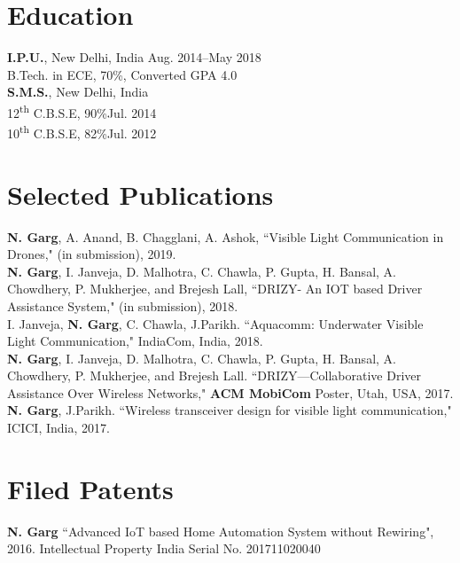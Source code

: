 \section{Education}
\textbf{I.P.U.},
New Delhi, India \hfill{Aug. 2014--May 2018}\\
B.Tech. in ECE, 70\%, Converted GPA 4.0\\
\textbf{S.M.S.},
New Delhi, India \\
12\textsuperscript{th} C.B.S.E, 90\%\hfill{Jul. 2014}\\
10\textsuperscript{th} C.B.S.E, 82\%\hfill{Jul. 2012}

\section{Selected Publications}
\textbf{N. Garg}, A. Anand, B. Chagglani, A. Ashok, ``Visible Light Communication in Drones," (in submission), 2019.\\
\textbf{N. Garg}, I. Janveja, D. Malhotra, C. Chawla, P. Gupta, H. Bansal, A. Chowdhery, P. Mukherjee, and Brejesh Lall, ``DRIZY- An IOT based Driver Assistance System," (in submission), 2018.\\
I. Janveja, \textbf{N. Garg}, C. Chawla, J.Parikh. ``Aquacomm: Underwater Visible Light Communication," IndiaCom, India, 2018.\\
\textbf{N. Garg}, I. Janveja, D. Malhotra, C. Chawla, P. Gupta, H. Bansal, A. Chowdhery, P. Mukherjee, and Brejesh Lall. ``DRIZY---Collaborative Driver Assistance Over Wireless Networks," \textbf{ACM MobiCom} Poster, Utah, USA, 2017.\\
\textbf{N. Garg}, J.Parikh. ``Wireless transceiver design for visible light communication," ICICI, India, 2017.

\section{Filed Patents}
\textbf{N. Garg} ``Advanced IoT based Home Automation System without Rewiring", 2016. Intellectual Property India Serial No. 201711020040

